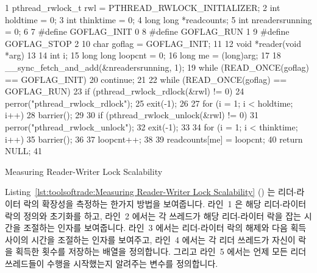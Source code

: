 \begin{listing}[tbp]
{ \scriptsize
\begin{verbbox}
  1 pthread_rwlock_t rwl = PTHREAD_RWLOCK_INITIALIZER;
  2 int holdtime = 0;
  3 int thinktime = 0;
  4 long long *readcounts;
  5 int nreadersrunning = 0;
  6 
  7 #define GOFLAG_INIT 0
  8 #define GOFLAG_RUN  1
  9 #define GOFLAG_STOP 2
 10 char goflag = GOFLAG_INIT;
 11 
 12 void *reader(void *arg)
 13 {
 14   int i;
 15   long long loopcnt = 0;
 16   long me = (long)arg;
 17 
 18   __sync_fetch_and_add(&nreadersrunning, 1);
 19   while (READ_ONCE(goflag) == GOFLAG_INIT) {
 20     continue;
 21   }
 22   while (READ_ONCE(goflag) == GOFLAG_RUN) {
 23     if (pthread_rwlock_rdlock(&rwl) != 0) {
 24       perror("pthread_rwlock_rdlock");
 25       exit(-1);
 26     }
 27     for (i = 1; i < holdtime; i++) {
 28       barrier();
 29     }
 30     if (pthread_rwlock_unlock(&rwl) != 0) {
 31       perror("pthread_rwlock_unlock");
 32       exit(-1);
 33     }
 34     for (i = 1; i < thinktime; i++) {
 35       barrier();
 36     }
 37     loopcnt++;
 38   }
 39   readcounts[me] = loopcnt;
 40   return NULL;
 41 }
\end{verbbox}
}
\centering
\theverbbox
\caption{Measuring Reader-Writer Lock Scalability}
\label{lst:toolsoftrade:Measuring Reader-Writer Lock Scalability}
\end{listing}

Listing~\ref{lst:toolsoftrade:Measuring Reader-Writer Lock Scalability}
()
는 리더-라이터 락의 확장성을 측정하는 한가지 방법을 보여줍니다.
라인~1 은 해당 리더-라이터 락의 정의와 초기화를 하고, 라인~2 에서는 각 쓰레드가
해당 리더-라이터 락을 잡는 시간을 조절하는  인자를 보여줍니다.
라인~3 에서는 리더-라이터 락의 해제와 다음 획득 사이의 시간을 조절하는
 인자를 보여주고, 라인~4 에서는 각 리더 쓰레드가 자신이 락을
획득한 횟수를 저장하는  배열을 정의합니다. 그리고 라인~5 에서는
언제 모든 리더 쓰레드들이 수행을 시작했는지 알려주는 
변수를 정의합니다.


